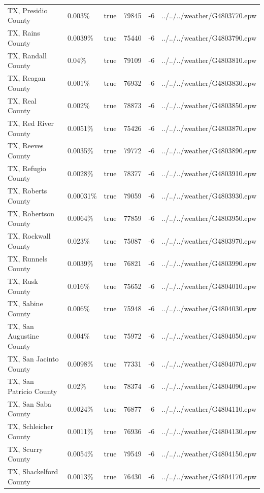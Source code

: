 \begin{longtable}[]{@{}llllll@{}}
TX, Presidio County & 0.003\% & true & 79845 & -6 &
../../../weather/G4803770.epw \\
TX, Rains County & 0.0039\% & true & 75440 & -6 &
../../../weather/G4803790.epw \\
TX, Randall County & 0.04\% & true & 79109 & -6 &
../../../weather/G4803810.epw \\
TX, Reagan County & 0.001\% & true & 76932 & -6 &
../../../weather/G4803830.epw \\
TX, Real County & 0.002\% & true & 78873 & -6 &
../../../weather/G4803850.epw \\
TX, Red River County & 0.0051\% & true & 75426 & -6 &
../../../weather/G4803870.epw \\
TX, Reeves County & 0.0035\% & true & 79772 & -6 &
../../../weather/G4803890.epw \\
TX, Refugio County & 0.0028\% & true & 78377 & -6 &
../../../weather/G4803910.epw \\
TX, Roberts County & 0.00031\% & true & 79059 & -6 &
../../../weather/G4803930.epw \\
TX, Robertson County & 0.0064\% & true & 77859 & -6 &
../../../weather/G4803950.epw \\
TX, Rockwall County & 0.023\% & true & 75087 & -6 &
../../../weather/G4803970.epw \\
TX, Runnels County & 0.0039\% & true & 76821 & -6 &
../../../weather/G4803990.epw \\
TX, Rusk County & 0.016\% & true & 75652 & -6 &
../../../weather/G4804010.epw \\
TX, Sabine County & 0.006\% & true & 75948 & -6 &
../../../weather/G4804030.epw \\
TX, San Augustine County & 0.004\% & true & 75972 & -6 &
../../../weather/G4804050.epw \\
TX, San Jacinto County & 0.0098\% & true & 77331 & -6 &
../../../weather/G4804070.epw \\
TX, San Patricio County & 0.02\% & true & 78374 & -6 &
../../../weather/G4804090.epw \\
TX, San Saba County & 0.0024\% & true & 76877 & -6 &
../../../weather/G4804110.epw \\
TX, Schleicher County & 0.0011\% & true & 76936 & -6 &
../../../weather/G4804130.epw \\
TX, Scurry County & 0.0054\% & true & 79549 & -6 &
../../../weather/G4804150.epw \\
TX, Shackelford County & 0.0013\% & true & 76430 & -6 &
../../../weather/G4804170.epw \\

\end{longtable}
